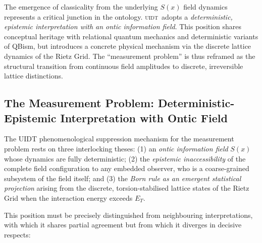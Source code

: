 \documentclass[12pt,a4paper,twoside]{article}
\theoremstyle{plain}
\theoremstyle{definition}
\theoremstyle{remark}
\newcommand{\UIDT}{\textsc{uidt}}
\begin{document}
\clearpage
The emergence of classicality from the underlying $S(x)$ field dynamics
represents a critical junction in the ontology. \UIDT\ adopts a
\emph{deterministic, epistemic interpretation with an ontic information field}.
This position shares conceptual heritage with relational quantum mechanics and
deterministic variants of QBism, but introduces a concrete physical mechanism
via the discrete lattice dynamics of the Rietz Grid. The ``measurement problem''
is thus reframed as the structural transition from continuous field amplitudes
to discrete, irreversible lattice distinctions.

\subsection{The Measurement Problem: Deterministic-Epistemic Interpretation with Ontic Field}
\label{subsec:measurement-interpretation}

The UIDT phenomenological suppression mechanism for the measurement problem rests on three interlocking
theses: (1) an \emph{ontic information field} $S(x)$ whose dynamics are fully
deterministic; (2) the \emph{epistemic inaccessibility} of the complete field
configuration to any embedded observer, who is a coarse-grained subsystem of
the field itself; and (3) the \emph{Born rule as an emergent statistical
projection} arising from the discrete, torsion-stabilised lattice states of
the Rietz Grid when the interaction energy exceeds $E_T$.

This position must be precisely distinguished from neighbouring
interpretations, with which it shares partial agreement but from which it
diverges in decisive respects:
\end{document}
